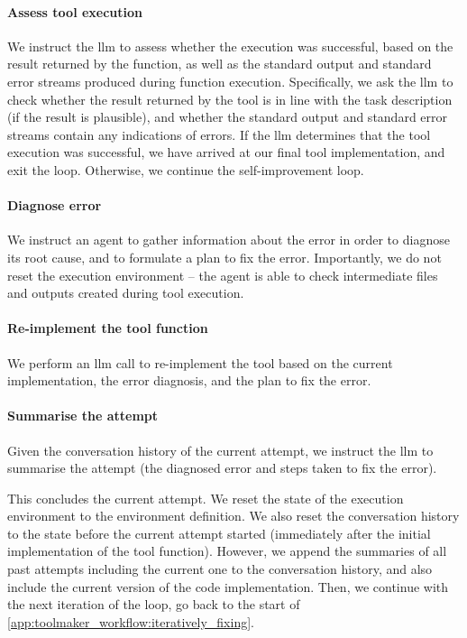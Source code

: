 \paragraph{\:Assess tool execution}
We instruct the \gls{llm} to assess whether the execution was successful, based on the result returned by the function, as well as the standard output and standard error streams produced during function execution.
Specifically, we ask the \gls{llm} to check whether the result returned by the tool is in line with the task description (\ie if the result is plausible), and whether the standard output and standard error streams contain any indications of errors.
If the \gls{llm} determines that the tool execution was successful, we have arrived at our final tool implementation, and exit the loop.
Otherwise, we continue the self-improvement loop.

\paragraph{\:Diagnose error}
We instruct an agent to gather information about the error in order to diagnose its root cause, and to formulate a plan to fix the error.
Importantly, we do not reset the execution environment -- the agent is able to check intermediate files and outputs created during tool execution.

\paragraph{\:Re-implement the tool function}
We perform an \gls{llm} call to re-implement the tool based on the current implementation, the error diagnosis, and the plan to fix the error.


\paragraph{\:Summarise the attempt}
Given the conversation history of the current attempt, we instruct the \gls{llm} to summarise the attempt (\ie the diagnosed error and steps taken to fix the error).

This concludes the current attempt.
We reset the state of the execution environment to the environment definition.
We also reset the conversation history to the state before the current attempt started (\ie immediately after the initial implementation of the tool function). However, we append the summaries of all past attempts including the current one to the conversation history, and also include the current version of the code implementation.
Then, we continue with the next iteration of the loop, \ie go back to the start of \cref{app:toolmaker_workflow:iteratively_fixing}.



